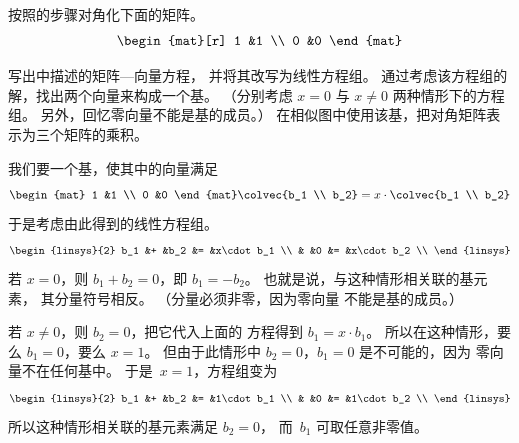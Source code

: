 \begin{exercises}
\begin{answer}
    \end{answer}
  \recommended \item \label{exer:DiagTheseA}
    按照的步骤对角化下面的矩阵。
    \begin{equation*}
      \begin{mat}[r]
      1  &1  \\
      0  &0
      \end{mat}
    \end{equation*}
    \begin{exparts}
      \partsitem 写出中描述的矩阵—向量方程，
         并将其改写为线性方程组。
      \partsitem 通过考虑该方程组的解，找出两个向量来构成一个基。
         （分别考虑 $x=0$ 与
         $x\neq 0$ 两种情形下的方程组。
         另外，回忆零向量不能是基的成员。）
      \partsitem 在相似图中使用该基，把对角矩阵表示为三个矩阵的乘积。
    \end{exparts}
    \begin{answer}
     \begin{exparts}
        \partsitem 我们要一个基，使其中的向量满足
          \begin{equation*}
            \begin{mat}
              1 &1 \\
              0 &0
            \end{mat}
            \colvec{b_1 \\ b_2}
            =x\cdot \colvec{b_1 \\ b_2}
          \end{equation*}
          于是考虑由此得到的线性方程组。
          \begin{equation*}
            \begin{linsys}{2}
              b_1 &+ &b_2 &= &x\cdot b_1 \\
                  &  &0   &= &x\cdot b_2 \\
            \end{linsys}
          \end{equation*}
        \partsitem
          若 $x=0$，则 $b_1+b_2=0$，即 $b_1=-b_2$。
          也就是说，与这种情形相关联的基元素，
          其分量符号相反。
          （分量必须非零，因为零向量
          不能是基的成员。）

          若 $x\neq 0$，则 $b_2=0$，把它代入上面的
          方程得到 $b_1=x\cdot b_1$。
          所以在这种情形，要么 $b_1=0$，要么 $x=1$。
          但由于此情形中 $b_2=0$，$b_1=0$ 是不可能的，因为
          零向量不在任何基中。
          于是~$x=1$，方程组变为
          \begin{equation*}
            \begin{linsys}{2}
              b_1 &+ &b_2 &= &1\cdot b_1 \\
                  &  &0   &= &1\cdot b_2 \\
            \end{linsys}
          \end{equation*}
          所以这种情形相关联的基元素满足 $b_2=0$，
          而~$b_1$ 可取任意非零值。


\end{exparts}
\end{answer}
\end{exercises}

